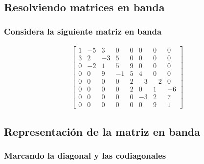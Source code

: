 \subsection{Resolviendo matrices en banda}
\begin{frame}[plain]
\frametitle{Considera la siguiente matriz en banda}
\fontsize{12}{12}\selectfont
\begin{align*}
\begin{bmatrix}
1 & -5 & 3 & 0 & 0 & 0 & 0 & 0 \\
3 & 2 & -3 & 5 & 0 & 0 & 0 & 0 \\
0 & -2 & 1 & 5 & 9 & 0 & 0 & 0 \\
0 & 0 & 9 & -1 & 5 & 4 & 0 & 0 \\
0 & 0 & 0 & 0 & 2 & -3 & -2 & 0 \\
0 & 0 & 0 & 0 & 2 & 0 & 1 & -6 \\
0 & 0 & 0 & 0 & 0 & -3 & 2 & 7 \\
0 & 0 & 0 & 0 & 0 & 0 & 9 & 1 
\end{bmatrix}
\end{align*}
\end{frame}
\subsection{Representación de la matriz en banda}
\begin{frame}[plain]
\frametitle{Marcando la diagonal y las codiagonales}
\begin{figure}
    \centering
        
\end{figure}
\end{frame}
